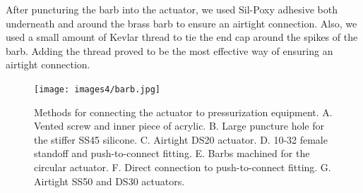 After puncturing the barb into the actuator, we used Sil-Poxy adhesive both underneath and around the brass barb to ensure an airtight connection. Also, we used a small amount of Kevlar thread to tie the end cap around the spikes of the barb. Adding the thread proved to be the most effective way of ensuring an airtight connection. 

\begin{figure}[ht!]
    \centering
    \texttt{[image: images4/barb.jpg]}
    \caption{Methods for connecting the actuator to pressurization equipment. A. Vented screw and inner piece of acrylic. B. Large puncture hole for the stiffer SS45 silicone. C. Airtight DS20 actuator. D. 10-32 female standoff and push-to-connect fitting. E. Barbs machined for the circular actuator. F. Direct connection to push-to-connect fitting. G. Airtight SS50 and DS30 actuators. }
    \label{fig:barb}
\end{figure}